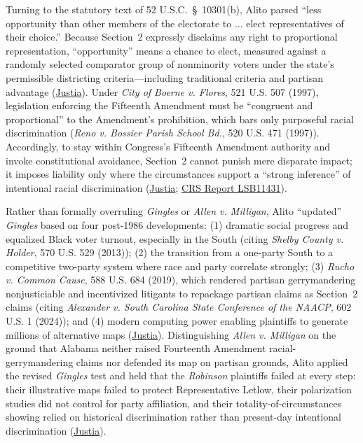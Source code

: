 \documentclass[12pt]{article}
\begin{document}
Turning to the statutory text of 52 U.S.C.~\S~10301(b), Alito parsed ``less opportunity than other members of the electorate to ... elect representatives of their choice.'' Because Section~2 expressly disclaims any right to proportional representation, ``opportunity'' means a chance to elect, measured against a randomly selected comparator group of nonminority voters under the state's permissible districting criteria---including traditional criteria and partisan advantage (\href{https://supreme.justia.com/cases/federal/us/608/24-109/}{Justia}). Under \textit{City of Boerne v. Flores}, 521 U.S. 507 (1997), legislation enforcing the Fifteenth Amendment must be ``congruent and proportional'' to the Amendment's prohibition, which bars only purposeful racial discrimination (\textit{Reno v. Bossier Parish School Bd.}, 520 U.S. 471 (1997)). Accordingly, to stay within Congress's Fifteenth Amendment authority and invoke constitutional avoidance, Section~2 cannot punish mere disparate impact; it imposes liability only where the circumstances support a ``strong inference'' of intentional racial discrimination (\href{https://supreme.justia.com/cases/federal/us/608/24-109/}{Justia}; \href{https://www.everycrsreport.com/reports/LSB11431.html}{CRS Report LSB11431}).

Rather than formally overruling \textit{Gingles} or \textit{Allen v. Milligan}, Alito ``updated'' \textit{Gingles} based on four post-1986 developments: (1) dramatic social progress and equalized Black voter turnout, especially in the South (citing \textit{Shelby County v. Holder}, 570 U.S. 529 (2013)); (2) the transition from a one-party South to a competitive two-party system where race and party correlate strongly; (3) \textit{Rucho v. Common Cause}, 588 U.S. 684 (2019), which rendered partisan gerrymandering nonjusticiable and incentivized litigants to repackage partisan claims as Section~2 claims (citing \textit{Alexander v. South Carolina State Conference of the NAACP}, 602 U.S. 1 (2024)); and (4) modern computing power enabling plaintiffs to generate millions of alternative maps (\href{https://supreme.justia.com/cases/federal/us/608/24-109/}{Justia}). Distinguishing \textit{Allen v. Milligan} on the ground that Alabama neither raised Fourteenth Amendment racial-gerrymandering claims nor defended its map on partisan grounds, Alito applied the revised \textit{Gingles} test and held that the \textit{Robinson} plaintiffs failed at every step: their illustrative maps failed to protect Representative Letlow, their polarization studies did not control for party affiliation, and their totality-of-circumstances showing relied on historical discrimination rather than present-day intentional discrimination (\href{https://supreme.justia.com/cases/federal/us/608/24-109/}{Justia}).
\end{document}

